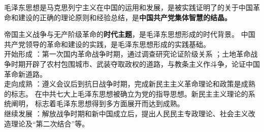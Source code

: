 {{毛泽东思想是马克思列宁主义在中国的运用和发展，是被实践证明了}{的关于中国革命和建设的正确的理论原则和经验总结，是}\textbf{{中国共产党集\textbf{体}}{\textbf{智慧的结晶。}}}}

{帝国主义战争与无产阶级革命的\textbf{时代主题}，是毛泽东思想形成的时代背景。}{
    {
}{{中国共产党领导的革命和建设的实践，是毛泽东思想形成的实践基础。\\
}{开始形成}{ }{：第一次国内革命战争时期，通过调查研究论证阶级关系
；土地革命战争时期开辟了农村包围城市、武装夺取政权的道路，与教条主义作斗争，论证中国革命新道路。\\
}{走向成熟}{
}{：遵义会议后到抗日战争时期，完成新民主主义革命理论和政策是成熟的标志。
在中共七大上毛泽东思想被确立为党的指导思想。新民主主义理论的系统阐明，
标志着毛泽东思想得到多方面展开而达到成熟。\\
}{继续发展}{
：解放战争时期和新中国成立后，提出人民民主专政理论、社会主义改造理论及``第二次结合''等。}}\\
}
